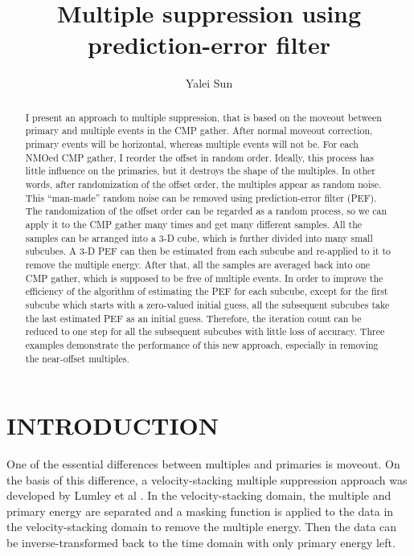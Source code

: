 
\title{Multiple suppression using prediction-error filter}

\author{Yalei Sun}

\maketitle

\begin{abstract}
I present an approach to multiple suppression, that is 
based on the moveout between primary and multiple events in the CMP gather.
After normal moveout correction, primary events will be horizontal, 
whereas multiple events will not be. 
For each NMOed CMP gather, I reorder the 
offset in random order. Ideally, this process has little influence on the 
primaries, but 
it destroys the shape of the multiples. In other words, after randomization 
of the offset order, the multiples appear as random noise. This ``man-made''
random noise can be removed using prediction-error filter (PEF). 
The randomization of the offset order can be regarded as a random process, 
so we can apply it to the CMP gather many times and get many different 
samples. All the samples can be arranged into a 3-D cube, which is further 
divided into many small subcubes. A 3-D PEF can then be estimated from each 
subcube and re-applied 
to it to remove the multiple energy. After that, all the samples are averaged 
back into one CMP gather, which is supposed to be free of multiple events. 
In order to improve the efficiency of the 
algorithm of estimating the PEF for each subcube, except for the first 
subcube which starts with a zero-valued initial guess, all the subsequent 
subcubes take the last estimated PEF as an initial guess. 
Therefore, the iteration 
count can be reduced to one step for all the subsequent subcubes with little 
loss of accuracy. 
Three examples demonstrate the performance of this new approach, especially in 
removing the near-offset multiples.
\end{abstract}


\section{INTRODUCTION}

One of the essential differences between multiples and primaries is moveout. 
On the basis of this difference, a velocity-stacking multiple suppression
approach was developed by Lumley et al . In the 
velocity-stacking domain, the multiple and primary energy are separated and 
a masking function is applied to the data in the velocity-stacking domain to 
remove the multiple energy. Then the data can be
inverse-transformed back to the time domain with only primary energy left.

